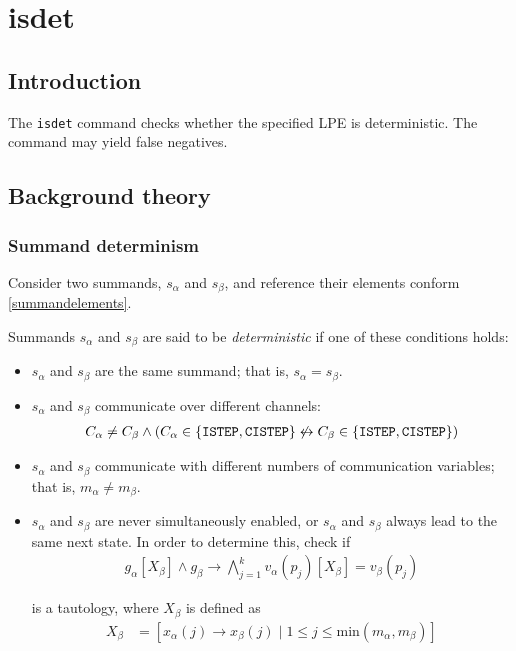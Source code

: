 \chapter{isdet} \label{isdet}

\section{Introduction}

The \texttt{isdet} command checks whether the specified LPE is deterministic.
The command may yield false negatives.

\section{Background theory}

\subsection{Summand determinism}

Consider two summands, $s_\alpha$ and $s_\beta$, and reference their elements conform \ref{summandelements}.

Summands $s_\alpha$ and $s_\beta$ are said to be \emph{deterministic} if one of these conditions holds:

\begin{itemize}
\item $s_\alpha$ and $s_\beta$ are the same summand; that is, $s_\alpha = s_\beta$.

\item $s_\alpha$ and $s_\beta$ communicate over different channels:
\begin{align*}
C_\alpha \neq C_\beta \land (C_\alpha \in \{\texttt{ISTEP}{}, \texttt{CISTEP}{}\} \not\leftrightarrow C_\beta \in \{\texttt{ISTEP}{}, \texttt{CISTEP}{}\})
\end{align*}

\item $s_\alpha$ and $s_\beta$ communicate with different numbers of communication variables; that is, $m_\alpha \neq m_\beta$.

\item $s_\alpha$ and $s_\beta$ are never simultaneously enabled, or $s_\alpha$ and $s_\beta$ always lead to the same next state.
In order to determine this, check if
\begin{align*}
g_\alpha[X_\beta] \land g_\beta \rightarrow \bigwedge\limits_{j=1}^{k} v_\alpha(p_j)[X_\beta] = v_\beta(p_j)
\end{align*}

is a tautology, where $X_\beta$ is defined as
\begin{align*}
X_{\beta} &= [x_\alpha(j) \rightarrow x_\beta(j) \;|\; 1 \leq j \leq \text{min}(m_\alpha, m_\beta)]
\end{align*}
\end{itemize}

